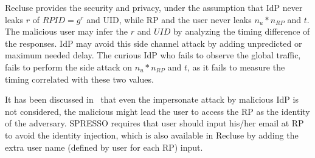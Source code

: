 Recluse provides the security and privacy, under the assumption that IdP never leaks $r$ of $RPID=g^r$ and UID, while RP and the user never leaks $n_u*n_{RP}$ and $t$. The malicious user may infer the $r$ and $UID$ by analyzing the timing difference of the responses. IdP may avoid this side channel attack by adding unpredicted or maximum needed delay. The curious IdP who fails to observe the global traffic, fails to perform the side attack on $n_u*n_{RP}$ and $t$, as it fails to measure the timing correlated with these two values.

 It has been discussed in~\cite{SPRESSO} that even the impersonate attack by malicious IdP is not considered, the malicious might lead the user to access the RP as the identity of the adversary. SPRESSO requires that user should input his/her email at RP to avoid the identity injection, which is also available in Recluse by adding the extra user name (defined by user for each RP) input.

